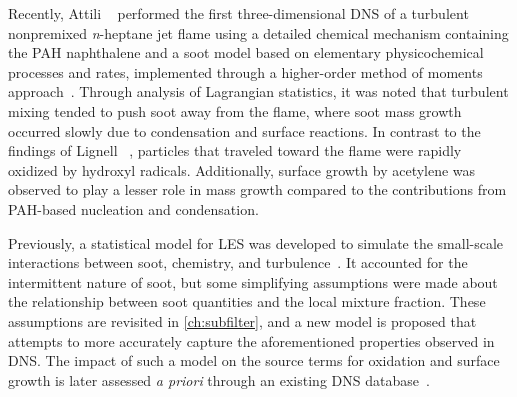 Recently, Attili \etal~\cite{attili2014} performed the first three-dimensional DNS of a turbulent nonpremixed \textit{n}-heptane jet flame using a detailed chemical mechanism containing the PAH naphthalene and a soot model based on elementary physicochemical processes and rates, implemented through a higher-order method of moments approach~\cite{hmom2009}. Through analysis of Lagrangian statistics, it was noted that turbulent mixing tended to push soot away from the flame, where soot mass growth occurred slowly due to condensation and surface reactions. In contrast to the findings of Lignell \etal~\cite{lignell2007,lignell2008}, particles that traveled toward the flame were rapidly oxidized by hydroxyl radicals. Additionally, surface growth by acetylene was observed to play a lesser role in mass growth compared to the contributions from PAH-based nucleation and condensation.

Previously, a statistical model for LES was developed to simulate the small-scale interactions between soot, chemistry, and turbulence~\cite{subfilterpdf2011}. It accounted for the intermittent nature of soot, but some simplifying assumptions were made about the relationship between soot quantities and the local mixture fraction. These assumptions are revisited in \cref{ch:subfilter}, and a new model is proposed that attempts to more accurately capture the aforementioned properties observed in DNS. The impact of such a model on the source terms for oxidation and surface growth is later assessed \textit{a priori} through an existing DNS database~\cite{attili2014}.




